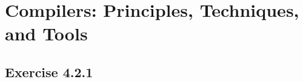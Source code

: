 \documentclass[letterpaper, 10pt,DIV=13]{scrartcl}
\numberwithin{equation}{section} %
\numberwithin{figure}{section} %
\numberwithin{table}{section} %
\begin{document}
\pagebreak

\section*{Compilers: Principles, Techniques, and Tools}
\subsection*{Exercise 4.2.1}

\pagebreak


 
\end{document}
